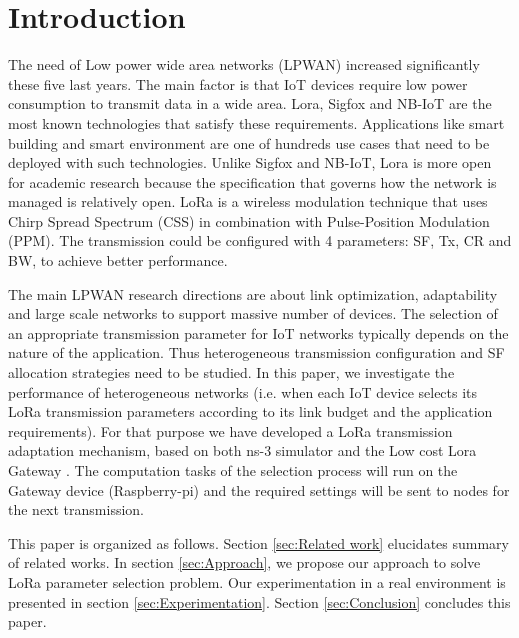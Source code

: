 \section{Introduction} \label{sec:Introduction}

The need of Low power wide area networks (LPWAN) increased significantly these five last years.
The main factor is that IoT devices require low power consumption to transmit data in a wide area.
Lora,
	Sigfox and NB-IoT are the most known technologies that satisfy these requirements.
Applications like smart building and smart environment are one of hundreds use cases that need to be deployed with such technologies.
Unlike Sigfox and NB-IoT,
	Lora is more open for academic research because the specification that governs how the network is managed is relatively open.
LoRa is a wireless modulation technique that uses Chirp Spread Spectrum (CSS) in combination with Pulse-Position Modulation (PPM).
The transmission could be configured with 4 parameters:
	\ac{SF},
	\ac{Tx},
	\ac{CR} and \ac{BW},
	to achieve better performance.

The main LPWAN research directions are about link optimization, adaptability and large scale networks to support massive number of devices.
The selection of an appropriate transmission parameter for IoT networks typically depends on the nature of the application.
Thus heterogeneous transmission configuration and \ac{SF} allocation strategies need to be studied.
In this paper,
	we investigate the performance of heterogeneous networks (i.e.
when each IoT device selects its LoRa transmission parameters according to its link budget and the application requirements).
For that purpose we have developed a LoRa transmission adaptation mechanism,
	based on both ns-3 simulator and the Low cost Lora Gateway \cite{lowcostloragateway}.
The computation tasks of the selection process will run on the Gateway device (Raspberry-pi) and the required settings will be sent to nodes for the next transmission.

This paper is organized as follows.
Section \ref{sec:Related work} elucidates summary of related works.
In section \ref{sec:Approach}, we propose our approach to solve LoRa parameter selection problem.
Our experimentation in a real environment is presented in section \ref{sec:Experimentation}.
Section \ref{sec:Conclusion} concludes this paper.


